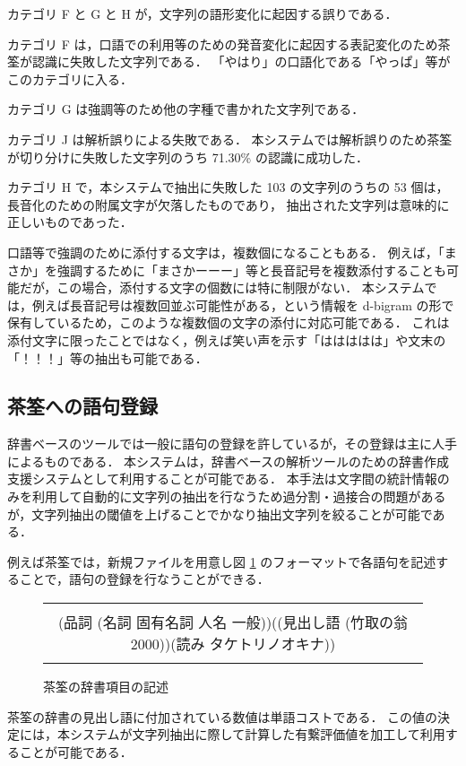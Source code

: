 カテゴリ F と G と H が，文字列の語形変化に起因する誤りである．

カテゴリ F は，口語での利用等のための発音変化に起因する表記変化のため茶筌が認識に失敗した文字列である．
「やはり」の口語化である「やっぱ」等がこのカテゴリに入る．

カテゴリ G は強調等のため他の字種で書かれた文字列である．

カテゴリ J は解析誤りによる失敗である．
本システムでは解析誤りのため茶筌が切り分けに失敗した文字列のうち 71.30\% の認識に成功した．

カテゴリ H で，本システムで抽出に失敗した 103 の文字列のうちの 53 個は，長音化のための附属文字が欠落したものであり，
抽出された文字列は意味的に正しいものであった．

口語等で強調のために添付する文字は，複数個になることもある．
例えば，「まさか」を強調するために「まさかーーー」等と長音記号を複数添付することも可能だが，この場合，添付する文字の個数には特に制限がない．
本システムでは，例えば長音記号は複数回並ぶ可能性がある，という情報を d-bigram の形で保有しているため，このような複数個の文字の添付に対応可能である．
これは添付文字に限ったことではなく，例えば笑い声を示す「ははははは」や文末の「！！！」等の抽出も可能である．
\subsection{茶筌への語句登録}
\label{sec:chasenentory}
辞書ベースのツールでは一般に語句の登録を許しているが，その登録は主に人手によるものである．
本システムは，辞書ベースの解析ツールのための辞書作成支援システムとして利用することが可能である．
本手法は文字間の統計情報のみを利用して自動的に文字列の抽出を行なうため過分割・過接合の問題があるが，文字列抽出の閾値を上げることでかなり抽出文字列を絞ることが可能である．

例えば茶筌では，新規ファイルを用意し図 \ref{fig:chasendic} のフォーマットで各語句を記述することで，語句の登録を行なうことができる\cite{chasen97}．
\begin{figure}[hbt]
\begin{minipage}{\textwidth}
\begin{center}
\begin{tabular}{c}
\hline
\hline
\\
(品詞 (名詞 固有名詞 人名 一般))((見出し語 (竹取の翁 2000))(読み タケトリノオキナ))\\
\\
\hline
\hline
\end{tabular}
\caption{茶筌の辞書項目の記述}
\label{fig:chasendic}
\end{center}
\end{minipage}
\end{figure}
茶筌の辞書の見出し語に付加されている数値は単語コストである．
この値の決定には，本システムが文字列抽出に際して計算した有繋評価値を加工して利用することが可能である．

